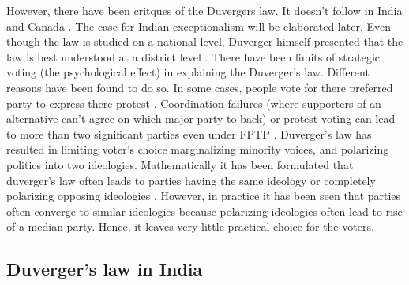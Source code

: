 \vspace{0.3cm}

However, there have been critques of the Duvergers law. It doesn't follow in India and Canada \citep{gaines1999duverger}. The case for Indian exceptionalism will be elaborated later. Even though the law is studied on a national level, Duverger himself presented that the law is best understood at a district level \citep{diwakar2007duverger}. There have been limits of strategic voting (the psychological effect) in explaining the Duverger's law. Different reasons have been found to do so. In some cases, people vote for there preferred party to express there protest \citep{ziegfeld2021accounts}. Coordination failures (where supporters of an alternative can’t agree on which major party to back) or protest voting can lead to more than two significant parties even under FPTP \citep{singer2013duverger}. Duverger's law has resulted in limiting voter's choice marginalizing minority voices, and polarizing politics into two ideologies. Mathematically it has been formulated that duverger's law often leads to parties having the same ideology or completely polarizing opposing ideologies \citep{fey2007duverger}. However, in practice it has been seen that parties often converge to similar ideologies because polarizing ideologies often lead to rise of a median party. Hence, it leaves very little practical choice for the voters.

\subsection{Duverger's law in India}

